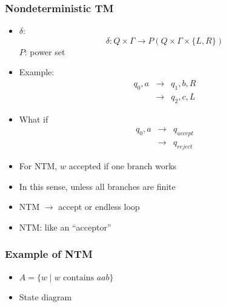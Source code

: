 




\begin{frame}[allowframebreaks] \frametitle{Nondeterministic TM}
  \begin{itemize}
\item $\delta$:
  \begin{equation*}
    \delta: Q\times \Gamma
\rightarrow P(Q\times \Gamma \times \{L,R\})
  \end{equation*}
$P$: power set

\item Example:
  \begin{eqnarray*}
    q_0,a & \rightarrow & q_1,b,R\\
& \rightarrow & q_2, c, L
  \end{eqnarray*}
\item What if 
  \begin{eqnarray*}
    q_0,a & \rightarrow & q_{accept} \\
& \rightarrow & q_{reject}
  \end{eqnarray*}

\item
  For NTM, $w$ accepted if one branch works

\item
  In this sense, unless all branches are finite

\item
  NTM $\rightarrow$ accept or endless loop

\item
  NTM: like an ``acceptor''

\end{itemize}\end{frame} \begin{frame}[allowframebreaks] \frametitle{Example of NTM}
  \begin{itemize}
\item 
$A = \{w\mid w\mbox{ contains } aab\}$
\item State diagram


\end{itemize}
\end{frame}
